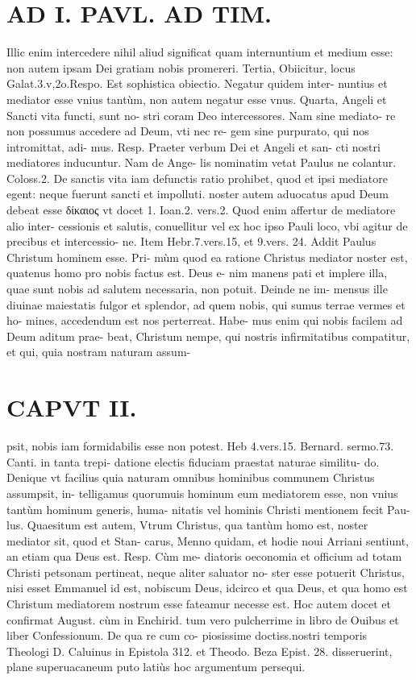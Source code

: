 \documentclass{article}
\begin{document}
\begin{pages}
\section*{AD I. PAVL. AD TIM. }
\marginpar{[ p.58 ]}\pstart Illic enim intercedere nihil aliud significat quam internuntium et medium esse: non autem ipsam Dei gratiam nobis promereri.  \pend\pstart Tertia, Obiicitur, locus Galat.3.v,2o.Respo. Est sophistica obiectio. Negatur quidem inter- nuntius et mediator esse vnius tantùm, non autem negatur esse vnus.  \pend\pstart Quarta, Angeli et Sancti vita functi, sunt no- stri coram Deo intercessores. Nam sine mediato- re non possumus accedere ad Deum, vti nec re- gem sine purpurato, qui nos intromittat, adi- mus. Resp. Praeter verbum Dei et Angeli et san- cti nostri mediatores inducuntur. Nam de Ange- lis nominatim vetat Paulus ne colantur. Coloss.2. De sanctis vita iam defunctis ratio prohibet, quod et ipsi mediatore egent: neque fuerunt sancti et impolluti. noster autem aduocatus apud Deum debeat esse δίκαιος vt docet 1. Ioan.2. vers.2.  \pend\pstart Quod enim affertur de mediatore alio inter- cessionis et salutis, conuellitur vel ex hoc ipso Pauli loco, vbi agitur de precibus et intercessio- ne. Item Hebr.7.vers.15, et 9.vers. 24.  \pend\pstart Addit Paulus Christum hominem esse. Pri- mùm quod ea ratione Christus mediator noster est, quatenus homo pro nobis factus est. Deus e- nim manens pati et implere illa, quae sunt nobis ad salutem necessaria, non potuit. Deinde ne im- mensus ille diuinae maiestatis fulgor et splendor, ad quem nobis, qui sumus terrae vermes et ho- mines, accedendum est nos perterreat. Habe- mus enim qui nobis facilem ad Deum aditum prae- beat, Christum nempe, qui nostris infirmitatibus compatitur, et qui, quia nostram naturam assum-  \pend
\section*{CAPVT II. }
\marginpar{[ p.58 ]}\pstart psit, nobis iam formidabilis esse non potest. Heb 4.vers.15. Bernard. sermo.73. Canti. in tanta trepi- datione electis fiduciam praestat naturae similitu- do. Denique vt facilius quia naturam omnibus hominibus communem Christus assumpsit, in- telligamus quorumuis hominum eum mediatorem esse, non vnius tantùm hominum generis, huma- nitatis vel hominis Christi mentionem fecit Pau- lus.  \pend\pstart Quaesitum est autem, Vtrum Christus, qua tantùm homo est, noster mediator sit, quod et Stan- carus, Menno quidam, et hodie noui Arriani sentiunt, an etiam qua Deus est. Resp. Cùm me- diatoris oeconomia et officium ad totam Christi petsonam pertineat, neque aliter saluator no- ster esse potuerit Christus, nisi esset Emmanuel id est, nobiscum Deus, idcirco et qua Deus, et qua homo est Christum mediatorem nostrum esse fateamur necesse est.  \pend\pstart Hoc autem docet et confirmat August. cùm in Enchirid. tum vero pulcherrime in libro de Ouibus  et liber  Confessionum. De qua re cum co- piosissime doctiss.nostri temporis Theologi D. Caluinus in Epistola 312. et Theodo. Beza Epist. 28. disseruerint, plane superuacaneum puto latiùs hoc argumentum persequi.  \pend
{}
{}

\end{pages}
\end{document}
